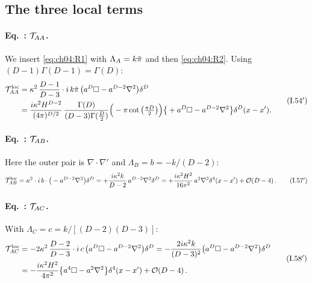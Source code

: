 \subsection{The three local terms \texorpdfstring{\tD}{}}

\paragraph{Eq.~: $\mathcal{T}_{AA}$.}
We insert \eqref{eq:ch04:R1} with $\Lambda_A=k\hat\pi$ and then \eqref{eq:ch04:R2}.
Using $(D-1)\Gamma(D-1)=\Gamma(D)$:
\begin{equation*}
\begin{aligned}
\mathcal{T}_{AA}^{\mathrm{loc}}&=\kappa^2\,\frac{D-1}{D-3}\cdot i\,k\hat\pi\,\big(a^D\square-a^{D-2}\nabla^2\big)\delta^D\\
&=\frac{i\kappa^2H^{D-2}}{(4\pi)^{D/2}}\,\frac{\Gamma(D)}{(D-3)\Gamma(\frac D2)}\Big(-\pi\cot\big(\tfrac{\pi D}{2}\big)\Big)
\big\{+a^D\square-a^{D-2}\nabla^2\big\}\delta^D(x-x').
\end{aligned}
\tag{I.54$'$}\label{eq:ch04:54}
\end{equation*}

\paragraph{Eq.~: $\mathcal{T}_{AB}$.}
Here the outer pair is $\nabla\!\cdot\!\nabla'$ and $\Lambda_B=b=-k/(D-2)$:
\begin{equation*}
\mathcal{T}_{AB}^{\mathrm{loc}}=\kappa^2\cdot i\,b\cdot\big(-a^{D-2}\nabla^2\big)\delta^D
=+\frac{i\kappa^2k}{D-2}\,a^{D-2}\nabla^2\delta^D
=+\frac{i\kappa^2H^2}{16\pi^2}\,a^2\nabla^2\delta^4(x-x')+\mathcal{O}\!\left(D-4\right).
\tag{I.57$'$}\label{eq:ch04:57}
\end{equation*}

\paragraph{Eq.~: $\mathcal{T}_{AC}$.}
With $\Lambda_C=c=k/[(D-2)(D-3)]$:
\begin{equation*}
\begin{aligned}
\mathcal{T}_{AC}^{\mathrm{loc}}&=-2\kappa^2\,\frac{D-2}{D-3}\cdot i\,c\,\big(a^D\square-a^{D-2}\nabla^2\big)\delta^D
=-\frac{2i\kappa^2k}{(D-3)^2}\big(a^D\square-a^{D-2}\nabla^2\big)\delta^D\\
&=-\frac{i\kappa^2H^2}{4\pi^2}\big\{a^4\square-a^2\nabla^2\big\}\delta^4(x-x')+\mathcal{O}\!\left(D-4\right).
\end{aligned}
\tag{I.58$'$}\label{eq:ch04:58}
\end{equation*}

